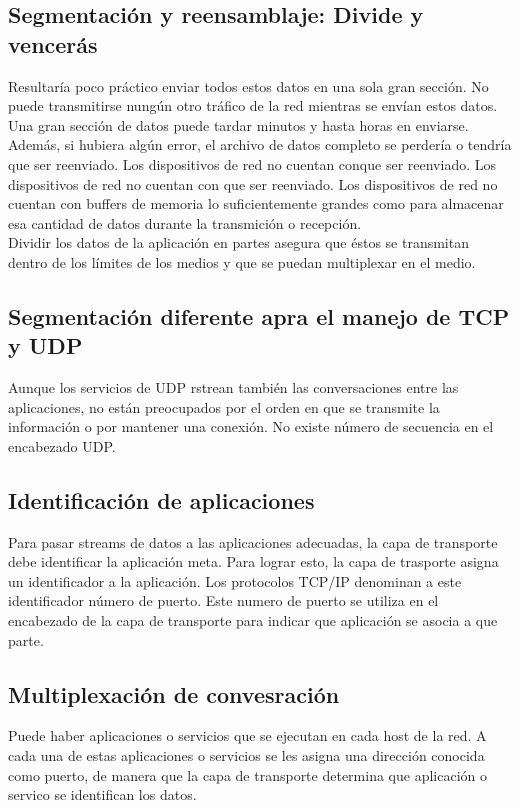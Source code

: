 \documentclass[12pt]{report}
\begin{document}
        \subsection*{Segmentación y reensamblaje: Divide y vencerás}
        Resultaría poco práctico enviar todos estos datos en una sola gran sección.
         No puede transmitirse nungún otro tráfico de la red mientras se envían estos datos.
          Una gran sección de datos puede tardar minutos y hasta horas en enviarse.
           \\Además, si hubiera algún error, el archivo de datos completo se perdería o tendría que ser reenviado.
            Los dispositivos de red no cuentan conque ser reenviado.
             Los dispositivos de red no cuentan con que ser reenviado.
              Los dispositivos de red no cuentan con buffers de memoria lo suficientemente grandes como para almacenar esa cantidad de datos durante la transmición o recepción. 
              \\Dividir los datos de la aplicación en partes asegura que éstos se transmitan dentro de los límites de los medios y que se puedan multiplexar en el medio. 
        \subsection*{Segmentación diferente apra el manejo de TCP y UDP}
        Aunque los servicios de UDP rstrean también las conversaciones entre las aplicaciones, no están preocupados por el orden en que se transmite la información o por mantener una conexión.
         No existe número de secuencia en el encabezado UDP.
        \subsection{Identificación de aplicaciones}
        Para pasar streams de datos a las aplicaciones adecuadas, la capa de transporte debe identificar la aplicación meta. Para lograr esto, la capa de trasporte asigna un identificador a la aplicación.
        Los protocolos TCP/IP denominan a este identificador número de puerto.
        Este numero de puerto se utiliza en el encabezado de la capa de transporte para indicar que aplicación se asocia a que parte.
        \subsection{Multiplexación de convesración}
        Puede haber aplicaciones o servicios que se ejecutan en cada host de la red.
        A cada una de estas aplicaciones o servicios se les asigna una dirección conocida como puerto, de manera que la capa de transporte determina que aplicación o servico se identifican los datos.
\end{document}
